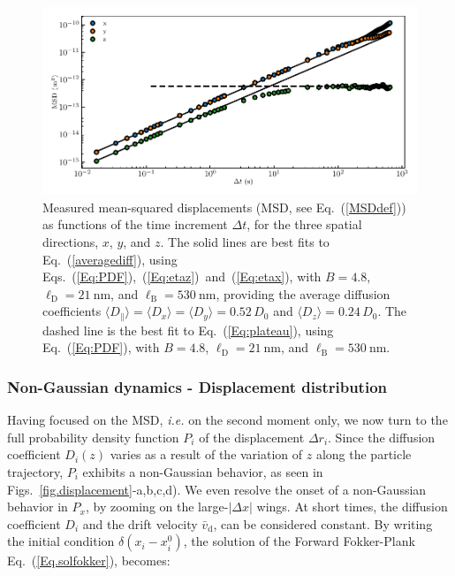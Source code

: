 \begin{figure}[t!]
	\centering
	\includegraphics{02_body/chapter3/images/trajctory_analysis/msd.pdf}
	\caption{Measured mean-squared displacements (MSD, see Eq.~(\ref{MSDdef})) as functions of the time increment $\Delta t$, for the three spatial directions, $x$, $y$, and $z$. The solid lines are best fits to Eq.~(\ref{averagediff}), using Eqs.~(\ref{Eq:PDF}),~(\ref{Eq:etaz})~and~(\ref{Eq:etax}), with $B = 4.8$, $\ell_\mathrm{D} = 21 ~ \mathrm{nm}$, and $\ell_\mathrm{B} = 530~\mathrm{nm}$,
		providing the average diffusion coefficients $\langle{D_\parallel}\rangle= \langle D_x\rangle=\langle D_y \rangle =0.52\,D_0$ and $\langle D_z \rangle =0.24\, D_0$. The dashed line is the best fit to Eq.~(\ref{Eq:plateau}), using Eq.~(\ref{Eq:PDF}), with $B = 4.8$, $\ell_\mathrm{D} = 21 ~ \mathrm{nm}$, and $\ell_\mathrm{B} = 530~\mathrm{nm}$.}
	\label{fig.MSD}
\end{figure}


\subsubsection{Non-Gaussian dynamics - Displacement distribution}

Having focused on the \gls{MSD}, \textit{i.e.} on the second moment only, we now turn to the full probability density function $P_i$ of the displacement $\Delta r_i$. Since the diffusion coefficient $D_i(z)$ varies as a result of the variation of $z$ along the particle trajectory, $P_i$ exhibits a non-Gaussian behavior, as seen in Figs.~\ref{fig.displacement}-a,b,c,d). We even resolve the onset of a non-Gaussian behavior in $P_x$, by zooming on the large-$\lvert\Delta x\rvert$ wings. At short times, the diffusion coefficient $D_i$ and the drift velocity $\bar{v}_\mathrm{d}$, can be considered constant. By writing the initial condition $\delta(x_i - x_i ^0)$, the solution of the Forward Fokker-Plank Eq.~(\ref{Eq.solfokker}), becomes:

